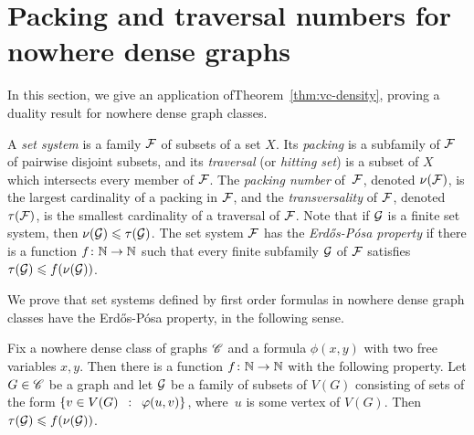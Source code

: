 \section{Packing and traversal numbers for nowhere dense graphs}\label{sec:ep}
In this section, we give an application 
ofTheorem~\ref{thm:vc-density}, proving a 
duality result for nowhere dense graph classes.

A \emph{set system} is a family  $\cal F$ of subsets of a set $X$.
Its  \emph{packing} is a subfamily of $\cal F$ of pairwise disjoint subsets, and its \emph{traversal} (or \emph{hitting set}) is a subset of $X$ which intersects every member of $\cal F$.
The \emph{packing number} of~$\cal F$, denoted $\nu(\cal F)$, is the largest cardinality of a packing in $\cal F$,
and the \emph{transversality} of $\cal F$, denoted
$\tau(\cal F)$, is the smallest cardinality of a traversal of $\cal F$.
Note that if $\cal G$ is a finite set system, then
$\nu({\cal G})\le \tau(\cal G)$. 
The set system $\cal F$ has the \emph{Erd{\H o}s-P\'{o}sa property} if there is a function $f\from\N\to\N$ such that every finite subfamily $\cal G$ of $\cal F$
satisfies $\tau({\cal G})\le f(\nu(\cal G))$. 

We prove that set systems defined by first order formulas in nowhere dense graph classes have the Erd{\H o}s-P\'{o}sa property, in the following sense.

 \setcounter{aux}{\thetheorem}
 \setcounter{theorem}{\theep}
\begin{theorem}
	Fix a nowhere dense class of graphs $\CCC$ and a 
	formula $\phi(x,y)$ with two free variables $x,y$.
	Then there is a function $f\from \N\to\N$ with the following property.
	Let $G\in \CCC$ be a graph and let $\cal G$
	be a family of subsets of $V(G)$ consisting of sets of the form $\setof{v\in V(G)}{\phi(u, v)}$, where~$u$ is some vertex of $V(G)$.
Then~$\tau({\cal G})\le f(\nu(\cal G))$.
\end{theorem}
 \setcounter{theorem}{\theaux}


